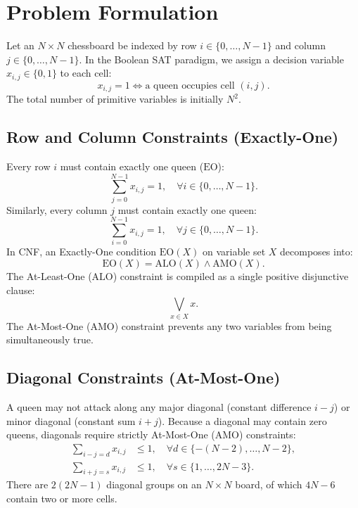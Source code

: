 \documentclass[a4paper,fleqn]{cas-sc}
\begin{document}
\section{Problem Formulation}
Let an $N \times N$ chessboard be indexed by row $i \in \{0, \dots, N-1\}$ and column $j \in \{0, \dots, N-1\}$. In the Boolean SAT paradigm, we assign a decision variable $x_{i, j} \in \{0, 1\}$ to each cell:
\begin{equation}
x_{i, j} = 1 \iff \text{a queen occupies cell } (i, j).
\end{equation}
The total number of primitive variables is initially $N^2$.

\subsection{Row and Column Constraints (Exactly-One)}
Every row $i$ must contain exactly one queen ($\text{EO}$):
\begin{equation}
\sum_{j=0}^{N-1} x_{i, j} = 1, \quad \forall i \in \{0, \dots, N-1\}.
\end{equation}
Similarly, every column $j$ must contain exactly one queen:
\begin{equation}
\sum_{i=0}^{N-1} x_{i, j} = 1, \quad \forall j \in \{0, \dots, N-1\}.
\end{equation}
In CNF, an Exactly-One condition $\text{EO}(X)$ on variable set $X$ decomposes into:
\begin{equation}
\text{EO}(X) = \text{ALO}(X) \land \text{AMO}(X).
\end{equation}
The At-Least-One ($\text{ALO}$) constraint is compiled as a single positive disjunctive clause:
\begin{equation}
\bigvee_{x \in X} x.
\end{equation}
The At-Most-One ($\text{AMO}$) constraint prevents any two variables from being simultaneously true.

\subsection{Diagonal Constraints (At-Most-One)}
A queen may not attack along any major diagonal (constant difference $i - j$) or minor diagonal (constant sum $i + j$). Because a diagonal may contain zero queens, diagonals require strictly At-Most-One ($\text{AMO}$) constraints:
\begin{align}
\sum_{i - j = d} x_{i, j} &\le 1, \quad \forall d \in \{-(N-2), \dots, N-2\}, \\
\sum_{i + j = s} x_{i, j} &\le 1, \quad \forall s \in \{1, \dots, 2N-3\}.
\end{align}
There are $2(2N - 1)$ diagonal groups on an $N \times N$ board, of which $4N - 6$ contain two or more cells.
\end{document}
